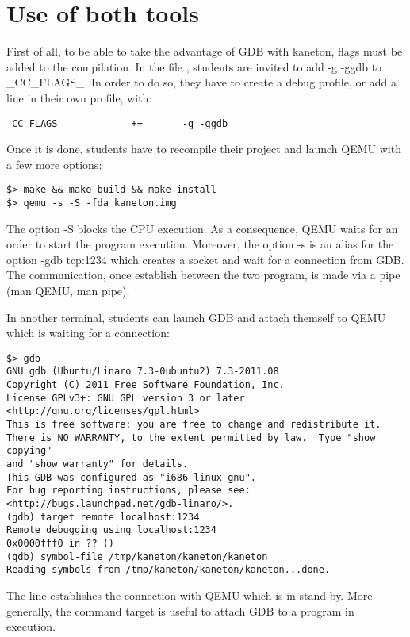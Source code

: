 \section{Use of both tools}


First of all, to be able to take the advantage of GDB with kaneton, flags must be added to the compilation. In the file , students are invited to add -g -ggdb to \_CC\_FLAGS\_. In order to do so, they have to create a debug profile, or add a line in their own profile, with:
\begin{verbatim}
_CC_FLAGS_            +=       -g -ggdb
\end{verbatim}

Once it is done, students have to recompile their project and launch QEMU with a few more options:
\begin{verbatim}
$> make && make build && make install
$> qemu -s -S -fda kaneton.img
\end{verbatim}

The option -S blocks the CPU execution. As a consequence, QEMU waits for an order to start the program execution. Moreover, the option -s is an alias for the option -gdb tcp:1234 which creates a socket and wait for a connection from GDB. The communication, once establish between the two program, is made via a pipe (man QEMU, man pipe).

In another terminal, students can launch GDB and attach themself to QEMU which is waiting for a connection:
\begin{verbatim}
$> gdb
GNU gdb (Ubuntu/Linaro 7.3-0ubuntu2) 7.3-2011.08
Copyright (C) 2011 Free Software Foundation, Inc.
License GPLv3+: GNU GPL version 3 or later <http://gnu.org/licenses/gpl.html>
This is free software: you are free to change and redistribute it.
There is NO WARRANTY, to the extent permitted by law.  Type "show copying"
and "show warranty" for details.
This GDB was configured as "i686-linux-gnu".
For bug reporting instructions, please see:
<http://bugs.launchpad.net/gdb-linaro/>.
(gdb) target remote localhost:1234
Remote debugging using localhost:1234
0x0000fff0 in ?? ()
(gdb) symbol-file /tmp/kaneton/kaneton/kaneton
Reading symbols from /tmp/kaneton/kaneton/kaneton...done.
\end{verbatim}

The line  establishes the connection with QEMU which is in stand by. More generally, the command target is useful to attach GDB to a program in execution.

